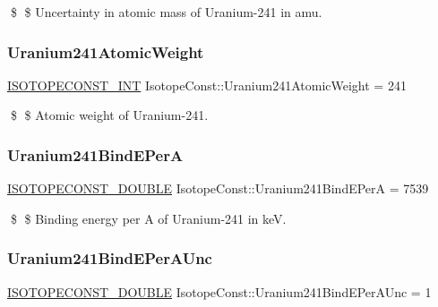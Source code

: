 \$ \$ Uncertainty in atomic mass of Uranium-\/241 in amu. \mbox{\label{group___isotope_const-_uranium-_u241_ga82d12bac2543f3209517408fa168aae2}} 
\subsubsection{\texorpdfstring{Uranium241\+Atomic\+Weight}{Uranium241AtomicWeight}}
{\footnotesize\ttfamily \mbox{\hyperlink{group___isotope_const-_macros_ga5f18360b3e99483a35c32d789e62621c}{I\+S\+O\+T\+O\+P\+E\+C\+O\+N\+S\+T\+\_\+\+I\+NT}} Isotope\+Const\+::\+Uranium241\+Atomic\+Weight = 241}

\$ \$ Atomic weight of Uranium-\/241. \mbox{\label{group___isotope_const-_uranium-_u241_ga59e3fbf64296666f3c4f734e41e9621b}} 
\subsubsection{\texorpdfstring{Uranium241\+Bind\+E\+PerA}{Uranium241BindEPerA}}
{\footnotesize\ttfamily \mbox{\hyperlink{group___isotope_const-_macros_ga8f45a7272ce02c0b4c65c44636ed719a}{I\+S\+O\+T\+O\+P\+E\+C\+O\+N\+S\+T\+\_\+\+D\+O\+U\+B\+LE}} Isotope\+Const\+::\+Uranium241\+Bind\+E\+PerA = 7539}

\$ \$ Binding energy per A of Uranium-\/241 in keV. \mbox{\label{group___isotope_const-_uranium-_u241_ga073a2a0693885b84e42ed92bd77c6925}} 
\subsubsection{\texorpdfstring{Uranium241\+Bind\+E\+Per\+A\+Unc}{Uranium241BindEPerAUnc}}
{\footnotesize\ttfamily \mbox{\hyperlink{group___isotope_const-_macros_ga8f45a7272ce02c0b4c65c44636ed719a}{I\+S\+O\+T\+O\+P\+E\+C\+O\+N\+S\+T\+\_\+\+D\+O\+U\+B\+LE}} Isotope\+Const\+::\+Uranium241\+Bind\+E\+Per\+A\+Unc = 1}

